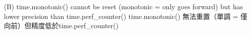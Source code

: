 \documentclass[10pt,UTF8]{ctexart}
\begin{document}
(B) time.monotonic() cannot be reset (monotonic = only goes forward) but has lower precision than time.perf\_counter()
  time.monotonic() 無法重置（單調 = 僅向前）但精度低於time.perf\_counter()










\clearpage
\end{document}
